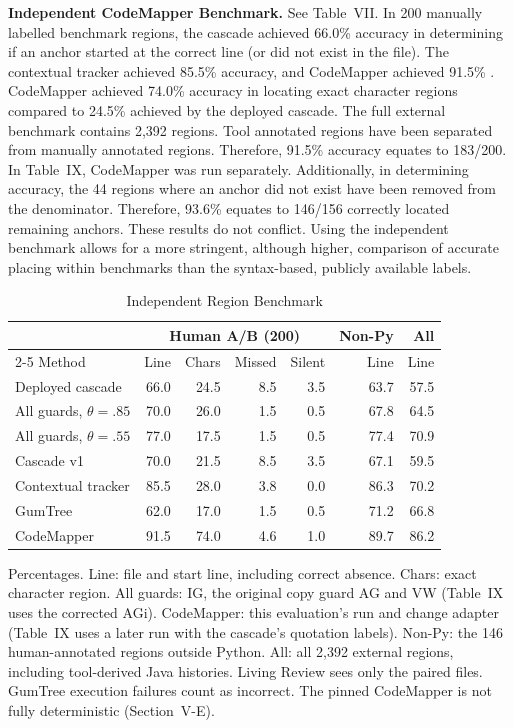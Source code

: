 \documentclass[10pt,conference,letterpaper]{IEEEtran}
\newcommand{\tablenote}[1]{\par\smallskip\parbox{\linewidth}{\footnotesize #1}}
\begin{document}
\textbf{Independent CodeMapper Benchmark.} See Table~VII. In 200 manually labelled benchmark regions, the cascade achieved 66.0\% accuracy in determining if an anchor started at the correct line (or did not exist in the file). The contextual tracker achieved 85.5\% accuracy, and CodeMapper achieved 91.5\% \cite{codemapper2026}. CodeMapper achieved 74.0\% accuracy in locating exact character regions compared to 24.5\% achieved by the deployed cascade. The full external benchmark contains 2,392 regions. Tool annotated regions have been separated from manually annotated regions. Therefore, 91.5\% accuracy equates to 183/200. In Table~IX, CodeMapper was run separately. Additionally, in determining accuracy, the 44 regions where an anchor did not exist have been removed from the denominator. Therefore, 93.6\% equates to 146/156 correctly located remaining anchors. These results do not conflict. Using the independent benchmark allows for a more stringent, although higher, comparison of accurate placing within benchmarks than the syntax-based, publicly available labels.

\begin{table}[!t]\caption{Independent Region Benchmark}\label{tab:human}
\centering\footnotesize\setlength{\tabcolsep}{2.5pt}
\begin{tabular}{@{}lrrrrrr@{}}\toprule
 & \multicolumn{4}{c}{Human A/B (200)} & Non-Py & All \\ \cmidrule(lr){2-5}
Method & Line & Chars & Missed & Silent & Line & Line \\ \midrule
Deployed cascade & 66.0 & 24.5 & 8.5 & 3.5 & 63.7 & 57.5 \\
All guards, $\theta=.85$ & 70.0 & 26.0 & 1.5 & 0.5 & 67.8 & 64.5 \\
All guards, $\theta=.55$ & 77.0 & 17.5 & 1.5 & 0.5 & 77.4 & 70.9 \\
Cascade v1 & 70.0 & 21.5 & 8.5 & 3.5 & 67.1 & 59.5 \\
Contextual tracker & 85.5 & 28.0 & 3.8 & 0.0 & 86.3 & 70.2 \\
GumTree & 62.0 & 17.0 & 1.5 & 0.5 & 71.2 & 66.8 \\
CodeMapper & 91.5 & 74.0 & 4.6 & 1.0 & 89.7 & 86.2 \\
\bottomrule
\end{tabular}
\tablenote{Percentages. Line: file and start line, including correct absence. Chars: exact character region. All guards: IG, the original copy guard AG and VW (Table~IX uses the corrected AGi). CodeMapper: this evaluation's run and change adapter (Table~IX uses a later run with the cascade's quotation labels). Non-Py: the 146 human-annotated regions outside Python. All: all 2,392 external regions, including tool-derived Java histories. Living Review sees only the paired files. GumTree execution failures count as incorrect. The pinned CodeMapper is not fully deterministic (Section~V-E).}
\end{table}
\end{document}
